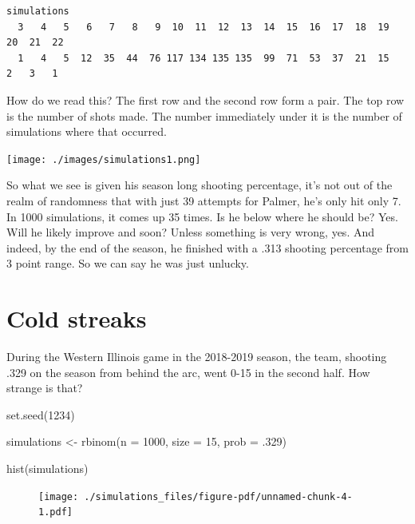 \documentclass[
  letterpaper,
  DIV=11,
  numbers=noendperiod]{scrreprt}
\newenvironment{Shaded}{\begin{snugshade}}{\end{snugshade}}
\newcommand{\AttributeTok}[1]{\textcolor[rgb]{0.40,0.45,0.13}{#1}}
\newcommand{\DecValTok}[1]{\textcolor[rgb]{0.68,0.00,0.00}{#1}}
\newcommand{\FunctionTok}[1]{\textcolor[rgb]{0.28,0.35,0.67}{#1}}
\newcommand{\NormalTok}[1]{\textcolor[rgb]{0.00,0.23,0.31}{#1}}
\newcommand{\OtherTok}[1]{\textcolor[rgb]{0.00,0.23,0.31}{#1}}
\begin{document}
\begin{verbatim}
simulations
  3   4   5   6   7   8   9  10  11  12  13  14  15  16  17  18  19  20  21  22 
  1   4   5  12  35  44  76 117 134 135 135  99  71  53  37  21  15   2   3   1 
\end{verbatim}

How do we read this? The first row and the second row form a pair. The
top row is the number of shots made. The number immediately under it is
the number of simulations where that occurred.

\texttt{[image: ./images/simulations1.png]}

So what we see is given his season long shooting percentage, it's not
out of the realm of randomness that with just 39 attempts for Palmer,
he's only hit only 7. In 1000 simulations, it comes up 35 times. Is he
below where he should be? Yes. Will he likely improve and soon? Unless
something is very wrong, yes. And indeed, by the end of the season, he
finished with a .313 shooting percentage from 3 point range. So we can
say he was just unlucky.

\hypertarget{cold-streaks}{%
\section{Cold streaks}\label{cold-streaks}}

During the Western Illinois game in the 2018-2019 season, the team,
shooting .329 on the season from behind the arc, went 0-15 in the second
half. How strange is that?

\begin{Shaded}
\begin{Highlighting}[]
\FunctionTok{set.seed}\NormalTok{(}\DecValTok{1234}\NormalTok{)}

\NormalTok{simulations }\OtherTok{\textless{}{-}} \FunctionTok{rbinom}\NormalTok{(}\AttributeTok{n =} \DecValTok{1000}\NormalTok{, }\AttributeTok{size =} \DecValTok{15}\NormalTok{, }\AttributeTok{prob =}\NormalTok{ .}\DecValTok{329}\NormalTok{)}

\FunctionTok{hist}\NormalTok{(simulations)}
\end{Highlighting}
\end{Shaded}

\begin{figure}[H]

{\centering \texttt{[image: ./simulations\_files/figure-pdf/unnamed-chunk-4-1.pdf]}

}

\end{figure}
\end{document}
